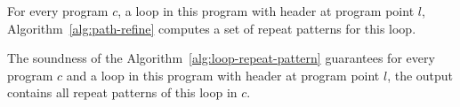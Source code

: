 %
\begin{thm}
  \label{thm:sound_loop-rpattern}
  For every program $c$, a loop in this program with header at program point $l$,
  Algorithm~\ref{alg:path-refine} computes a set of repeat patterns for this loop.
\end{thm}
The soundness of the Algorithm~\ref{alg:loop-repeat-pattern} guarantees for every program $c$ and a loop in this program with header at program point $l$,
the output contains all repeat patterns of this loop in $c$.
%

